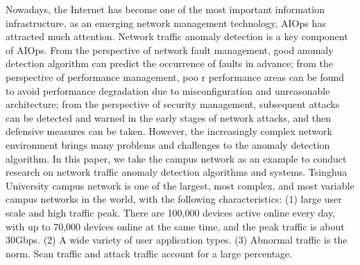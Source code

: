 \begin{abstract*}
  Nowadays, the Internet has become one of the most important information infrastructure, as an emerging network management technology, AIOps has attracted much attention. Network traffic anomaly detection is a key component of AIOps. From the perspective of network fault management, good anomaly detection algorithm can predict the occurrence of faults in advance; from the perspective of performance management, poo r performance areas can be found to avoid performance degradation due to misconfiguration and unreasonable architecture; from the perspective of security management, subsequent attacks can be detected and warned in the early stages of network attacks, and then defensive measures can be taken. However, the increasingly complex network environment brings many problems and challenges to the anomaly detection algorithm. In this paper, we take the campus network as an example to conduct research on network traffic anomaly detection algorithms and systems. Tsinghua University campus network is one of the largest, most complex, and most variable campus networks in the world, with the following characteristics: (1) large user scale and high traffic peak. There are 100,000 devices active online every day, with up to 70,000 devices online at the same time, and the peak traffic is about 30Gbps. (2) A wide variety of user application types. (3) Abnormal traffic is the norm. Scan traffic and attack traffic account for a large percentage.


\end{abstract*}
